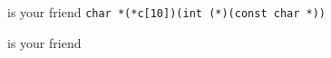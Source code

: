 \begin{frame}{ is your friend}
   \lstinline[basicstyle=\ttfamily\large]{char *(*c[10])(int (*)(const char *))}
\end{frame}
\begin{frame}{ is your friend}
    
\end{frame}


